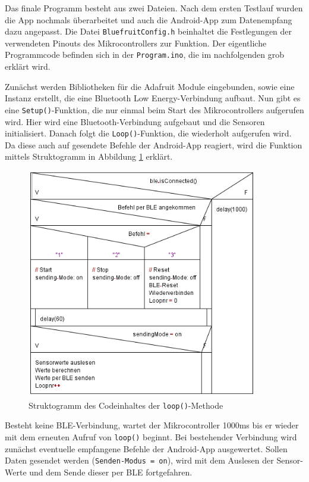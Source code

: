 Das finale Programm besteht aus zwei Dateien. Nach dem ersten Testlauf wurden die App nochmals überarbeitet und auch die Android-App zum Datenempfang dazu angepasst. Die Datei \texttt{BluefruitConfig.h} beinhaltet die Festlegungen der verwendeten Pinouts des Mikrocontrollers zur Funktion. Der eigentliche Programmcode befinden sich in der \texttt{Program.ino}, die im nachfolgenden grob erklärt wird.

Zunächst werden Bibliotheken für die Adafruit Module eingebunden, sowie eine Instanz erstellt, die eine Bluetooth Low Energy-Verbindung aufbaut. Nun gibt es eine \texttt{Setup()}-Funktion, die nur einmal beim Start des Mikrocontrollers aufgerufen wird. Hier wird eine Bluetooth-Verbindung aufgebaut und die Sensoren initialisiert. Danach folgt die \texttt{Loop()}-Funktion, die wiederholt aufgerufen wird. Da diese auch auf gesendete Befehle der Android-App reagiert, wird die Funktion mittels Struktogramm in Abbildung \ref{fig:k3_loopstructo} erklärt.

\begin{figure}[h]
	\centering
	\includegraphics[width=0.9\textwidth]{images/k3-loopstructo.png}
	\caption {Struktogramm des Codeinhaltes der \texttt{loop()}-Methode}
	\label{fig:k3_loopstructo}
\end{figure}

Besteht keine BLE-Verbindung, wartet der Mikrocontroller 1000ms bis er wieder mit dem erneuten Aufruf von \texttt{loop()} beginnt. Bei bestehender Verbindung wird zunächst eventuelle empfangene Befehle der Android-App ausgewertet. Sollen Daten gesendet werden (\texttt{Senden-Modus = on}), wird mit dem Auslesen der Sensor-Werte und dem Sende dieser per BLE fortgefahren. 

